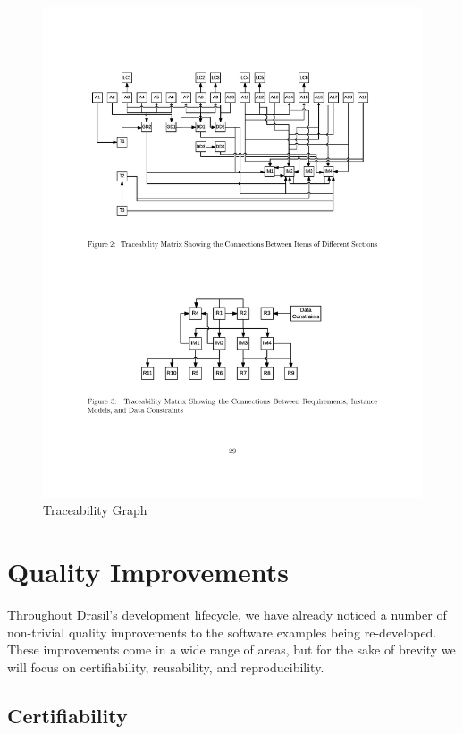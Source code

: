 \documentclass[sigconf]{acmart}
\begin{document}
\begin{figure}
\begin{center}
\includegraphics[scale=0.5]{./figures/TraceGraph.pdf}
\end{center}
\caption{Traceability Graph}
\label{Fig_TraceGraph}
\end{figure}

\section{Quality Improvements} \label{SecQuality}

Throughout Drasil's development lifecycle, we have already noticed a number of 
non-trivial quality improvements to the software examples being re-developed. 
These improvements come in a wide range of areas, but for the sake of brevity 
we will focus on certifiability, reusability, and reproducibility.

\subsection{Certifiability}
\end{document}
